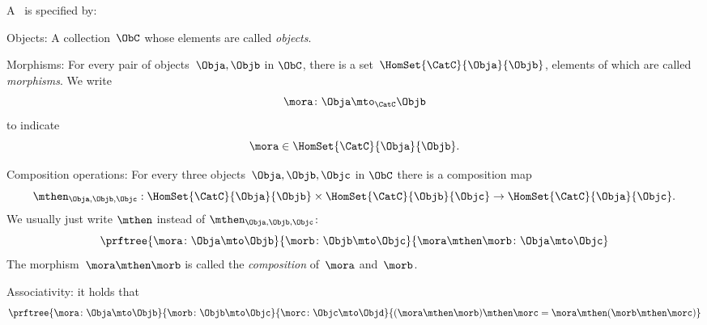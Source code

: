 \begin{ctdefinition}[Semicategory]
    \label{def:semicategory-compact}
    A \emph{}~\CatC is specified by:
    \begin{body}
        \constit
        \begin{compactenum}
            \item Objects: A collection\footnotemark~$\ObC$ whose elements are called \emph{objects}.
            \item Morphisms: For every pair of objects~$\Obja,\Objb$ in $\ObC$, there is a set~$\HomSet{\CatC}{\Obja}{\Objb}$, elements of which are called \emph{morphisms}. We write
            \begin{equation}
                \mora \colon \Obja \mto_\CatC \Objb
            \end{equation}
            to indicate
            \begin{equation}
                \mora \in \HomSet{\CatC}{\Obja}{\Objb}.
            \end{equation}
            \item Composition operations: For every three objects~$\Obja,\Objb,\Objc$ in $\ObC$ there is a composition map
            \begin{equation}
                \mthen_{\Obja,\Objb,\Objc}: \HomSet{\CatC}{\Obja}{\Objb} \times \HomSet{\CatC}{\Objb}{\Objc}\to \HomSet{\CatC}{\Obja}{\Objc}.
            \end{equation}
            We usually just write $\mthen$ instead of $\mthen_{\Obja,\Objb,\Objc}$:
            \begin{equation}
                \prftree{\mora \colon \Obja \mto \Objb}{\morb\colon \Objb \mto \Objc}{\mora \mthen \morb \colon \Obja \mto \Objc}
            \end{equation}
            The morphism~$\mora \mthen \morb$ is called the \emph{composition} of~$\mora$ and~$\morb$.
        \end{compactenum}
        \condit
        \begin{compactenum}
            \item Associativity: it holds that
            \begin{equation}
                \prftree{\mora\colon \Obja \mto \Objb}{\morb\colon \Objb \mto \Objc}{\morc\colon \Objc \mto \Objd}
                {
                    (\mora\mthen \morb)
                    \mthen \morc= \mora \mthen (\morb \mthen \morc)
                }
            \end{equation}
        \end{compactenum}
    \end{body}
\end{ctdefinition}

